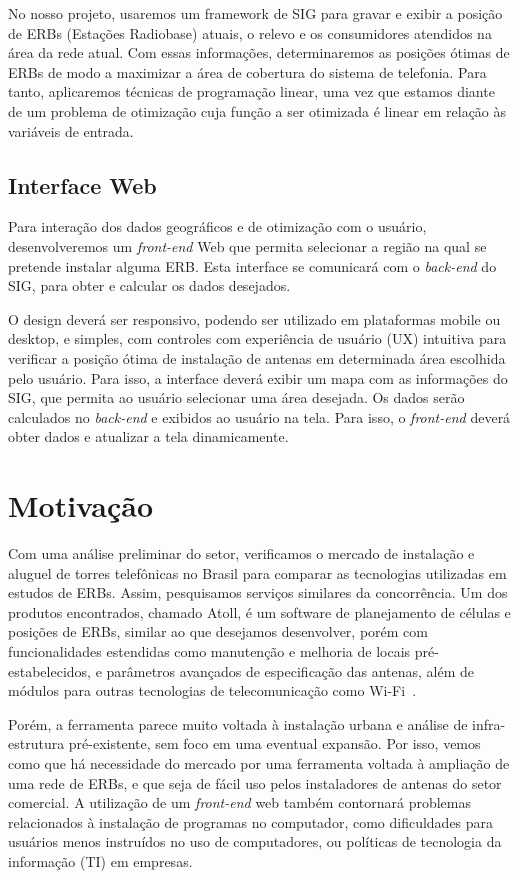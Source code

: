 \documentclass[]{politex}
\begin{document}
No nosso projeto, usaremos um framework de SIG para gravar e exibir a posição de
ERBs (Estações Radiobase) atuais, o relevo e os consumidores atendidos na área
da rede atual. Com essas informações, determinaremos as posições ótimas de
ERBs de modo a maximizar a área de cobertura do sistema de telefonia.
Para tanto, aplicaremos técnicas de programação linear, uma vez que
estamos diante de um problema de otimização cuja função a ser otimizada
é linear em relação às variáveis de entrada.

\subsection{Interface Web}

Para interação dos dados geográficos e de otimização com o usuário,
desenvolveremos um \textit{front-end} Web que permita selecionar a região na
qual se pretende instalar alguma ERB. Esta interface se comunicará com o
\textit{back-end} do SIG, para obter e calcular os dados desejados.

O design deverá ser responsivo, podendo ser utilizado em plataformas mobile
ou desktop, e simples, com controles com experiência de usuário (UX) intuitiva
para verificar a posição ótima de instalação de antenas em determinada área
escolhida pelo usuário. Para isso, a interface deverá exibir um mapa com as
informações do SIG, que permita ao usuário selecionar uma área desejada. Os
dados serão calculados no \textit{back-end} e exibidos ao usuário na tela. Para
isso, o \textit{front-end} deverá obter dados e atualizar a tela dinamicamente.

\section{Motivação}

Com uma análise preliminar do setor, verificamos o mercado de instalação e
aluguel de torres telefônicas no Brasil para comparar as tecnologias utilizadas
em estudos de ERBs. Assim, pesquisamos serviços similares da concorrência. Um
dos produtos encontrados, chamado Atoll, é um software de planejamento de
células e posições de ERBs, similar ao que desejamos desenvolver, porém com
funcionalidades estendidas como manutenção e melhoria de locais
pré-estabelecidos, e parâmetros avançados de especificação das antenas, além de
módulos para outras tecnologias de telecomunicação como Wi-Fi~\cite{atoll}.

Porém, a ferramenta parece muito voltada à instalação urbana e análise de
infra-estrutura pré-existente, sem foco em uma eventual expansão. Por isso,
vemos como que há necessidade do mercado por uma ferramenta voltada à ampliação
de uma rede de ERBs, e que seja de fácil uso pelos instaladores de antenas do
setor comercial. A utilização de um \textit{front-end} web também contornará
problemas relacionados à instalação de programas no computador, como
dificuldades para usuários menos instruídos no uso de computadores, ou políticas
de tecnologia da informação (TI) em empresas.
\end{document}

